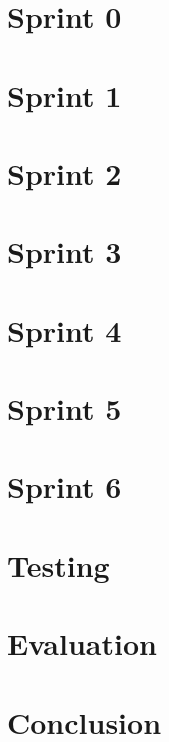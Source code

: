 \documentclass[11pt]{report}
\begin{document}
\chapter{Sprint 0}


\chapter{Sprint 1}


\chapter{Sprint 2}


\chapter{Sprint 3}


\chapter{Sprint 4}


\chapter{Sprint 5}


\chapter{Sprint 6}


\chapter{Testing}



\chapter{Evaluation}


\chapter{Conclusion}


\begin{flushleft}
	
	
\end{flushleft}

\appendix

\end{document}
